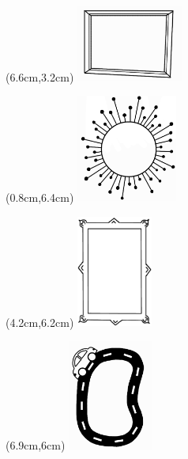 {\begin{textblock*}{6cm}(6.6cm,3.2cm) %
  \includegraphics[width=3.5cm]{./bilder/ramar/Ram6.png} %
\end{textblock*}



\begin{textblock*}{6cm}(0.8cm,6.4cm) %
  \includegraphics[width=3.3cm]{./bilder/ramar/Ram7.png} %
\end{textblock*}

\begin{textblock*}{6cm}(4.2cm,6.2cm) %
  \includegraphics[width=2.5cm]{./bilder/ramar/ram1.png} %
\end{textblock*}

\begin{textblock*}{6cm}(6.9cm,6cm) %
  \includegraphics[width=2.8cm]{./bilder/ramar/Ram8.png} %
\end{textblock*}



}
